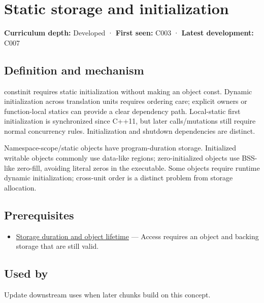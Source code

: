 \hypertarget{appendix-17c93c4c2f19}{}\label{referencestart:appendix-17c93c4c2f19}
\section{Static storage and initialization}\label{appendix-17c93c4c2f19-static-storage-and-initialization}

\textbf{Curriculum depth:} Developed · \textbf{First seen:} C003 · \textbf{Latest development:} C007

\subsection{Definition and mechanism}\label{appendix-17c93c4c2f19-definition-and-mechanism}

constinit requires static initialization without making an object const. Dynamic initialization across translation units requires ordering care; explicit owners or function-local statics can provide a clear dependency path. Local-static first initialization is synchronized since C++11, but later calls/mutations still require normal concurrency rules. Initialization and shutdown dependencies are distinct.

Namespace-scope/static objects have program-duration storage. Initialized writable objects commonly use data-like regions; zero-initialized objects use BSS-like zero-fill, avoiding literal zeros in the executable. Some objects require runtime dynamic initialization; cross-unit order is a distinct problem from storage allocation.

\subsection{Prerequisites}\label{appendix-17c93c4c2f19-prerequisites}

\begin{itemize}
\tightlist
\item
  \hyperref[appendix-0b104bcba06b]{Storage duration and object lifetime} --- Access requires an object and backing storage that are still valid.
\end{itemize}

\subsection{Used by}\label{appendix-17c93c4c2f19-used-by}

Update downstream uses when later chunks build on this concept.

